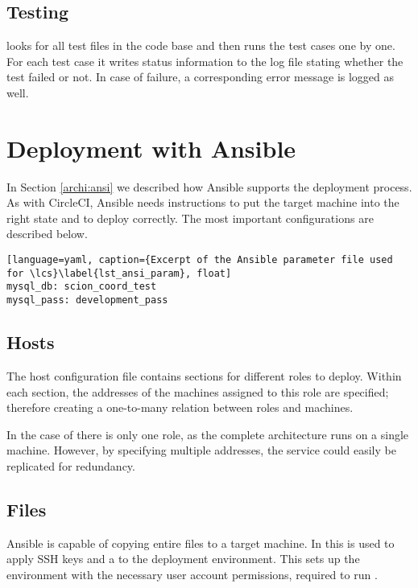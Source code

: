 \subsection{Testing}
 looks for all test files in the code base and then runs the test cases one by one. For each test case it writes status information to the log file stating whether the test failed or not. In case of failure, a corresponding error message is logged as well.

\section{Deployment with Ansible}
\label{impl:ansi}

In Section \ref{archi:ansi} we described how Ansible supports the deployment process. As with CircleCI, Ansible needs instructions to put the target machine into the right state and to deploy \lcs correctly. The most important configurations are described below.




\begin{lstlisting}[language=yaml, caption={Excerpt of the Ansible parameter file used for \lcs}\label{lst_ansi_param}, float]
mysql_db: scion_coord_test
mysql_pass: development_pass
\end{lstlisting}


\subsection{Hosts}
The host configuration file contains sections for different roles to deploy. Within each section, the addresses of the machines assigned to this role are specified; therefore creating a one-to-many relation between roles and machines.

In the case of \lcs there is only one role, as the complete architecture runs on a single machine.
However, by specifying multiple addresses, the service could easily be replicated for redundancy.

\subsection{Files}
Ansible is capable of copying entire files to a target machine. In \lcs this is used to apply SSH keys and a  to the deployment environment. This sets up the environment with the necessary user account permissions, required to run \lcs.

